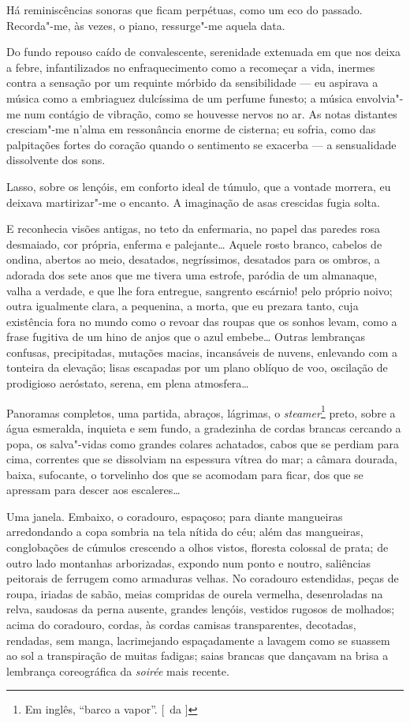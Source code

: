 Há reminiscências sonoras que ficam perpétuas, como um eco do passado.
Recorda"-me, às vezes, o piano, ressurge"-me aquela data. 

Do fundo repouso caído de convalescente, serenidade extenuada em que nos deixa a
febre, infantilizados no enfraquecimento como a recomeçar a vida,
inermes contra a sensação por um requinte mórbido da sensibilidade --- 
eu aspirava a música como a embriaguez dulcíssima de um perfume
funesto; a música envolvia"-me num contágio de vibração, como se
houvesse nervos no ar. As notas distantes cresciam"-me n'alma em
ressonância enorme de cisterna; eu sofria, como das palpitações fortes
do coração quando o sentimento se exacerba --- a sensualidade
dissolvente dos sons. 

Lasso, sobre os lençóis, em conforto ideal de
túmulo, que a vontade morrera, eu deixava martirizar"-me o encanto. A
imaginação de asas crescidas fugia solta. 

E reconhecia visões antigas,
no teto da enfermaria, no papel das paredes rosa desmaiado, cor
própria, enferma e palejante\ldots{} Aquele rosto branco, cabelos de ondina,
abertos ao meio, desatados, negríssimos, desatados para os ombros, a
adorada dos sete anos que me tivera uma estrofe, paródia
de um almanaque, valha a verdade, e que lhe fora entregue, sangrento
escárnio! pelo próprio noivo; outra igualmente clara, a pequenina, a
morta, que eu prezara tanto, cuja existência fora no mundo como o
revoar das roupas que os sonhos levam, como a frase fugitiva de um hino
de anjos que o azul embebe\ldots{} Outras lembranças confusas, precipitadas,
mutações macias, incansáveis de nuvens, enlevando com a tonteira da
elevação; lisas escapadas por um plano oblíquo de voo, oscilação de
prodigioso aeróstato, serena, em plena atmosfera\ldots{} 

Panoramas completos, uma partida, abraços, lágrimas, o \textit{steamer}\footnote{ Em inglês, 
``barco a vapor''. [~da ]} preto, sobre a
água esmeralda, inquieta e sem fundo, a gradezinha de cordas brancas
cercando a popa, os salva"-vidas como grandes colares achatados, cabos
que se perdiam para cima, correntes que se dissolviam na espessura
vítrea do mar; a câmara dourada, baixa, sufocante, o torvelinho dos que
se acomodam para ficar, dos que se apressam para descer aos
escaleres\ldots{} 

Uma janela. Embaixo, o coradouro, espaçoso; para diante
mangueiras arredondando a copa sombria na tela nítida do céu; além das
mangueiras, conglobações de cúmulos crescendo a olhos vistos, floresta
colossal de prata; de outro lado montanhas arborizadas, expondo num
ponto e noutro, saliências peitorais de ferrugem como armaduras velhas.
No coradouro estendidas, peças de roupa, iriadas de sabão, meias
compridas de ourela vermelha, desenroladas na relva, saudosas da perna
ausente, grandes lençóis, vestidos rugosos de molhados; acima do
coradouro, cordas, às cordas camisas transparentes, decotadas,
rendadas, sem manga, lacrimejando espaçadamente a lavagem como se
suassem ao sol a transpiração de muitas fadigas; saias brancas que
dançavam na brisa a lembrança coreográfica da \textit{soirée} mais recente.

